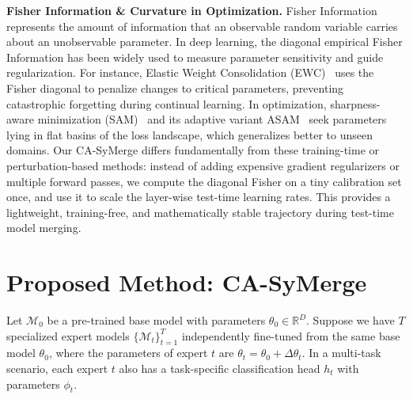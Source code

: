 \documentclass{article}
\begin{document}
\textbf{Fisher Information \& Curvature in Optimization.} Fisher Information represents the amount of information that an observable random variable carries about an unobservable parameter. In deep learning, the diagonal empirical Fisher Information has been widely used to measure parameter sensitivity and guide regularization. For instance, Elastic Weight Consolidation (EWC)~\cite{kirkpatrick17} uses the Fisher diagonal to penalize changes to critical parameters, preventing catastrophic forgetting during continual learning. In optimization, sharpness-aware minimization (SAM)~\cite{foret21} and its adaptive variant ASAM~\cite{du2021} seek parameters lying in flat basins of the loss landscape, which generalizes better to unseen domains. Our CA-SyMerge differs fundamentally from these training-time or perturbation-based methods: instead of adding expensive gradient regularizers or multiple forward passes, we compute the diagonal Fisher on a tiny calibration set once, and use it to scale the layer-wise test-time learning rates. This provides a lightweight, training-free, and mathematically stable trajectory during test-time model merging.

\section{Proposed Method: CA-SyMerge}
\label{sec:method}
Let $\mathcal{M}_0$ be a pre-trained base model with parameters $\theta_0 \in \mathbb{R}^D$. Suppose we have $T$ specialized expert models $\{\mathcal{M}_t\}_{t=1}^T$ independently fine-tuned from the same base model $\theta_0$, where the parameters of expert $t$ are $\theta_t = \theta_0 + \Delta \theta_t$. In a multi-task scenario, each expert $t$ also has a task-specific classification head $h_t$ with parameters $\phi_t$.
\end{document}
